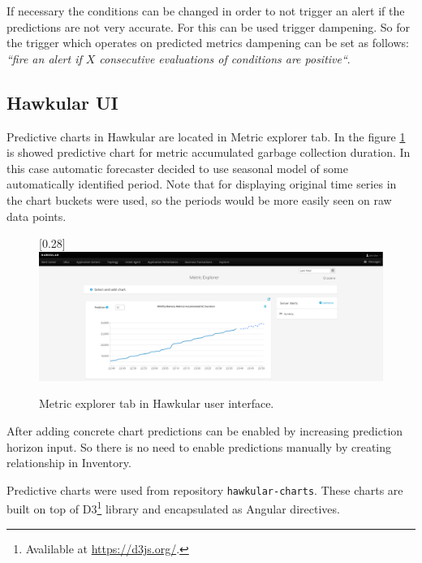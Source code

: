         If necessary the conditions can be changed in
        order to not trigger an alert if the predictions are not very accurate. For this can be used trigger dampening.
        So for the trigger which operates on predicted metrics dampening can be set as follows: \emph{``fire an alert if
        $X$ consecutive evaluations of conditions are positive``}.

        \subsection{Hawkular UI}
        Predictive charts in Hawkular are located in Metric explorer tab. In the figure \ref{img:hawkular-explorer}
        is showed predictive chart for metric accumulated garbage collection duration. In this case automatic
        forecaster decided to use seasonal model of some automatically identified period. Note that for displaying
        original time series in the chart buckets were used, so the periods would be more easily seen on raw data
        points.

        \begin{figure}[H]
            \begin{center}
                \scalebox{0.185}[0.28]{\includegraphics[angle=0]{img/hawkular-explorer.pdf}}
                \caption{Metric explorer tab in Hawkular user interface.}
                \label{img:hawkular-explorer}
            \end{center}
        \end{figure}

        After adding concrete chart predictions can be enabled by increasing prediction horizon input.
        So there is no need to enable predictions manually by creating relationship in Inventory.

        Predictive charts were used from repository \texttt{hawkular-charts}. These charts are built on top of
        D3\footnote{Avalilable at \url{https://d3js.org/}.} library and encapsulated as Angular directives.


